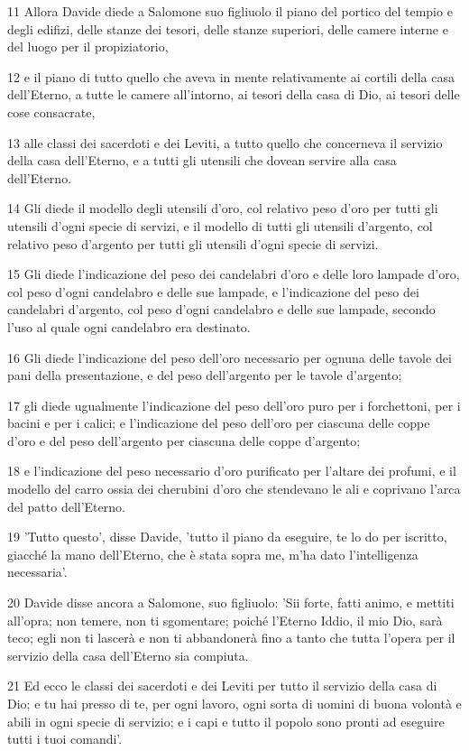 \par 11 Allora Davide diede a Salomone suo figliuolo il piano del portico del tempio e degli edifizi, delle stanze dei tesori, delle stanze superiori, delle camere interne e del luogo per il propiziatorio,
\par 12 e il piano di tutto quello che aveva in mente relativamente ai cortili della casa dell'Eterno, a tutte le camere all'intorno, ai tesori della casa di Dio, ai tesori delle cose consacrate,
\par 13 alle classi dei sacerdoti e dei Leviti, a tutto quello che concerneva il servizio della casa dell'Eterno, e a tutti gli utensili che dovean servire alla casa dell'Eterno.
\par 14 Gli diede il modello degli utensili d'oro, col relativo peso d'oro per tutti gli utensili d'ogni specie di servizi, e il modello di tutti gli utensili d'argento, col relativo peso d'argento per tutti gli utensili d'ogni specie di servizi.
\par 15 Gli diede l'indicazione del peso dei candelabri d'oro e delle loro lampade d'oro, col peso d'ogni candelabro e delle sue lampade, e l'indicazione del peso dei candelabri d'argento, col peso d'ogni candelabro e delle sue lampade, secondo l'uso al quale ogni candelabro era destinato.
\par 16 Gli diede l'indicazione del peso dell'oro necessario per ognuna delle tavole dei pani della presentazione, e del peso dell'argento per le tavole d'argento;
\par 17 gli diede ugualmente l'indicazione del peso dell'oro puro per i forchettoni, per i bacini e per i calici; e l'indicazione del peso dell'oro per ciascuna delle coppe d'oro e del peso dell'argento per ciascuna delle coppe d'argento;
\par 18 e l'indicazione del peso necessario d'oro purificato per l'altare dei profumi, e il modello del carro ossia dei cherubini d'oro che stendevano le ali e coprivano l'arca del patto dell'Eterno.
\par 19 'Tutto questo', disse Davide, 'tutto il piano da eseguire, te lo do per iscritto, giacché la mano dell'Eterno, che è stata sopra me, m'ha dato l'intelligenza necessaria'.
\par 20 Davide disse ancora a Salomone, suo figliuolo: 'Sii forte, fatti animo, e mettiti all'opra; non temere, non ti sgomentare; poiché l'Eterno Iddio, il mio Dio, sarà teco; egli non ti lascerà e non ti abbandonerà fino a tanto che tutta l'opera per il servizio della casa dell'Eterno sia compiuta.
\par 21 Ed ecco le classi dei sacerdoti e dei Leviti per tutto il servizio della casa di Dio; e tu hai presso di te, per ogni lavoro, ogni sorta di uomini di buona volontà e abili in ogni specie di servizio; e i capi e tutto il popolo sono pronti ad eseguire tutti i tuoi comandi'.


